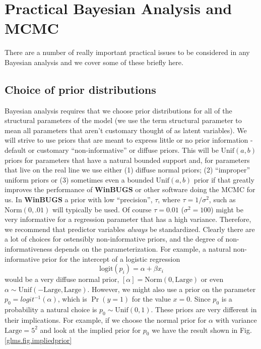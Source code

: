 \section{Practical Bayesian Analysis and MCMC}

There are a number of really important practical issues to be
considered in any Bayesian analysis and we cover some of these briefly
here.

\subsection{Choice of prior distributions}

Bayesian analysis requires that we choose prior
distributions for all of the structural parameters of the model (we
use the term structural parameter to mean all parameters that aren't
customary thought of as latent variables). We will strive to use
priors that are meant to express little or no prior information -
default or customary ``non-informative'' or diffuse priors. This will
be $\mbox{Unif}(a,b)$ priors for parameters that have a natural
bounded support and, for parameters that live on the real line we use
either (1) diffuse normal priors; (2) ``improper'' uniform priors or
(3) sometimes even a bounded $\mbox{Unif}(a,b)$ prior if that greatly
improves the performance of {\bf WinBUGS} or other software doing the MCMC
for us.  In {\bf WinBUGS} a prior with low ``precision'', $\tau$, where
$\tau = 1/\sigma^2$, such as $\mbox{Norm}(0,.01)$ will typically be
used. Of course $\tau = 0.01$ ($\sigma^{2} = 100$) might be very
informative for a regression parameter that has a high
variance. Therefore, we recommend that predictor variables {\it
  always} be standardized. Clearly there are a lot of choices for
ostensibly non-informative priors, and the degree of
non-informativeness depends on the parameterization. For example, a
natural non-informative prior for the intercept of a logistic
regression
\[
\mbox{logit}(p_{i}) = \alpha + \beta x_{i}
\]
would be a very diffuse normal prior,
$[\alpha] = \mbox{Norm}(0,\mbox{Large})$ or even
 $\alpha \sim
\mbox{Unif}(-\mbox{Large},\mbox{Large})$.
However, we might also use a prior on the parameter $p_0
= logit^{-1}(\alpha)$, which is $\Pr(y=1)$ for the value $x=0$. 
Since $p_0$ is a
probability a natural choice is $p_0 \sim \mbox{Unif}(0,1)$. 
These priors are very different in their implications. For example, if
we choose the normal prior for $\alpha$ with variance
$\mbox{Large} = 5^2$ and look at the implied prior for $p_{0}$
we have the result shown in Fig. \ref{glms.fig.impliedprior}
